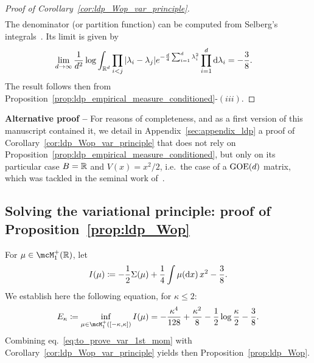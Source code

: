{\begin{proof}[Proof of Corollary~\ref{cor:ldp_Wop_var_principle}]
\begin{align}
\end{align}
The denominator (or partition function) can be computed from Selberg's integrals~\citep{mehta2014random}.
Its limit is given by
\begin{align}\label{eq:part_function_selberg}
    \lim_{d \to \infty} \frac{1}{d^2} \log \int_{\mathbb{R}^d} \prod_{i < j} |\lambda_i - \lambda_j| e^{-\frac{d}{4} \sum_{i=1}^d \lambda_i^2} \prod_{i=1}^d \mathrm{d} \lambda_i 
    &= - \frac{3}{8}.
\end{align}
The result follows then from Proposition~\ref{prop:ldp_empirical_measure_conditioned}-$(iii)$.
 \end{proof}

 \myskip
 \textbf{Alternative proof --}
 For reasons of completeness, and as a first version of this manuscript contained it, we detail in Appendix~\ref{sec:appendix_ldp} a proof of Corollary~\ref{cor:ldp_Wop_var_principle} 
 that does not rely on Proposition~\ref{prop:ldp_empirical_measure_conditioned}, but only on its particular case $B = \mathbb{R}$ and $V(x) = x^2/2$, i.e.\ the case of a $\mathrm{GOE}(d)$ matrix, which was 
 tackled in the seminal work of~\cite{arous1997large}.
 
 \subsection{Solving the variational principle: proof of Proposition~\ref{prop:ldp_Wop}}\label{subsec:var_principle_1st_mom}

 For $\mu \in \mcM_1^+(\bbR)$, let 
\begin{equation}\label{eq:def_I}
    I(\mu) \coloneqq -\frac{1}{2} \Sigma(\mu) + \frac{1}{4} \int \mu(\mathrm{d} x) \, x^2 - \frac{3}{8}.
\end{equation}
 We establish here the following equation, for $\kappa \leq 2$: 
 \begin{align}\label{eq:to_prove_var_1st_mom}
    E_\kappa \coloneqq \inf_{\mu \in \mcM_1^+([-\kappa, \kappa])} I(\mu) = 
    - \frac{\kappa^4}{128} + \frac{\kappa^2}{8} - \frac{1}{2} \log \frac{\kappa}{2} - \frac{3}{8}.
 \end{align}
 Combining eq.~\eqref{eq:to_prove_var_1st_mom} with Corollary~\ref{cor:ldp_Wop_var_principle} yields then Proposition~\ref{prop:ldp_Wop}.

}

